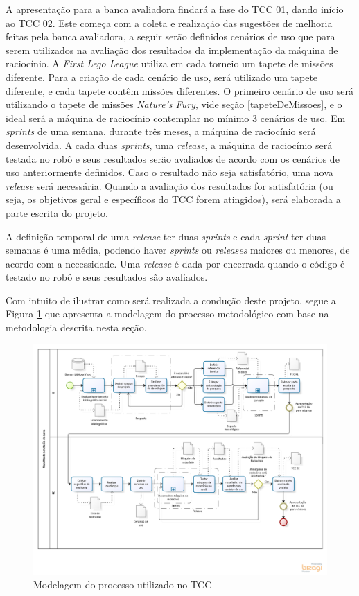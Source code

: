 A apresentação para a banca avaliadora findará a fase do TCC 01, dando início ao TCC 02. Este começa com a coleta e realização das sugestões de melhoria feitas pela banca avaliadora, a seguir serão definidos cenários de uso que para serem utilizados na avaliação dos resultados da implementação da máquina de raciocínio. 
A \textit{First Lego League} utiliza em cada torneio um tapete de missões diferente. Para a criação de cada cenário de uso, será utilizado um tapete diferente, e cada tapete contêm  missões diferentes. O primeiro cenário de uso será utilizando o tapete de missões \textit{Nature's Fury}, vide seção \ref{tapeteDeMissoes}, e o ideal será a máquina de raciocínio contemplar no mínimo 3 cenários de uso.
Em \textit{sprints} de uma semana, durante três meses, a máquina de raciocínio será desenvolvida. A cada duas \textit{sprints}, uma \textit{release}, a máquina de raciocínio será testada no robô e seus resultados serão avaliados de acordo com os cenários de uso anteriormente definidos. Caso o resultado não seja satisfatório, uma nova \textit{release} será necessária. Quando a avaliação dos resultados for satisfatória (ou seja, os objetivos geral e específicos do TCC forem atingidos), será elaborada a parte escrita do projeto.

A definição temporal de uma \textit{release} ter duas \textit{sprints} e cada \textit{sprint} ter duas semanas é uma média, podendo haver \textit{sprints} ou \textit{releases} maiores ou menores, de acordo com a necessidade. Uma \textit{release} é dada por encerrada quando o código é testado no robô e seus resultados são avaliados. 

Com intuito de ilustrar como será realizada a condução deste projeto, segue a
Figura \ref{modelagem} que apresenta a modelagem do processo metodológico com base na metodologia descrita nesta seção.

\FloatBarrier
\begin{figure}[!h]
\includegraphics[keepaspectratio=true,scale=0.54]{figuras/modelagemTcc.png}
\caption{Modelagem do processo utilizado no TCC}
\label{modelagem}
\end{figure}
\clearpage
 
